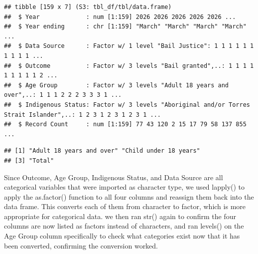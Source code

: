 \documentclass[
]{article}
\newenvironment{Shaded}{\begin{snugshade}}{\end{snugshade}}
\newcommand{\AttributeTok}[1]{\textcolor[rgb]{0.13,0.29,0.53}{#1}}
\newcommand{\CommentTok}[1]{\textcolor[rgb]{0.56,0.35,0.01}{\textit{#1}}}
\newcommand{\FunctionTok}[1]{\textcolor[rgb]{0.13,0.29,0.53}{\textbf{#1}}}
\newcommand{\NormalTok}[1]{#1}
\newcommand{\OtherTok}[1]{\textcolor[rgb]{0.56,0.35,0.01}{#1}}
\newcommand{\SpecialCharTok}[1]{\textcolor[rgb]{0.81,0.36,0.00}{\textbf{#1}}}
\newcommand{\StringTok}[1]{\textcolor[rgb]{0.31,0.60,0.02}{#1}}
\begin{document}
\begin{verbatim}
## tibble [159 x 7] (S3: tbl_df/tbl/data.frame)
##  $ Year             : num [1:159] 2026 2026 2026 2026 2026 ...
##  $ Year ending      : chr [1:159] "March" "March" "March" "March" ...
##  $ Data Source      : Factor w/ 1 level "Bail Justice": 1 1 1 1 1 1 1 1 1 1 ...
##  $ Outcome          : Factor w/ 3 levels "Bail granted",..: 1 1 1 1 1 1 1 1 1 2 ...
##  $ Age Group        : Factor w/ 3 levels "Adult 18 years and over",..: 1 1 1 2 2 2 3 3 3 1 ...
##  $ Indigenous Status: Factor w/ 3 levels "Aboriginal and/or Torres Strait Islander",..: 1 2 3 1 2 3 1 2 3 1 ...
##  $ Record Count     : num [1:159] 77 43 120 2 15 17 79 58 137 855 ...
\end{verbatim}

\begin{Shaded}
\end{Shaded}

\begin{verbatim}
## [1] "Adult 18 years and over" "Child under 18 years"   
## [3] "Total"
\end{verbatim}

Since Outcome, Age Group, Indigenous Status, and Data Source are all
categorical variables that were imported as character type, we used
lapply() to apply the as.factor() function to all four columns and
reassign them back into the data frame. This converts each of them from
character to factor, which is more appropriate for categorical data. we
then ran str() again to confirm the four columns are now listed as
factors instead of characters, and ran levels() on the Age Group column
specifically to check what categories exist now that it has been
converted, confirming the conversion worked.

\begin{Shaded}
\end{Shaded}
\end{document}
